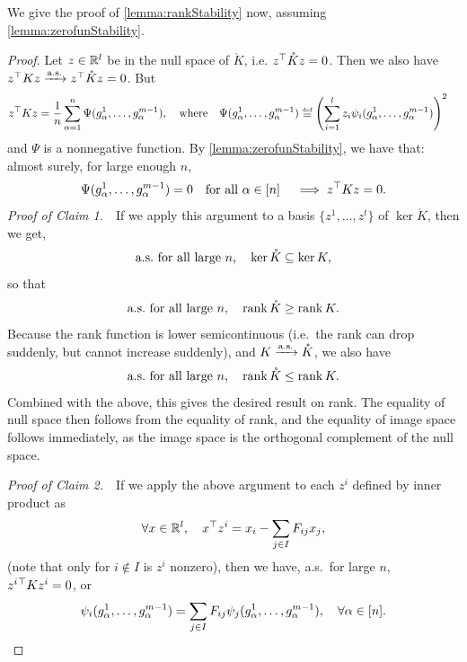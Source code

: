 \documentclass[main.tex]{subfiles}
\begin{document}
We give the proof of \cref{lemma:rankStability} now, assuming \cref{lemma:zerofunStability}.
\begin{proof}
  \newcommand{\myvv}{z}
Let $\myvv \in \R^l$ be in the null space of $\mathring K$, i.e. $\myvv^\trsp \mathring K \myvv = 0$.
Then we also have $\myvv^\trsp K \myvv \asto \myvv^\trsp \mathring K \myvv = 0$.
But
\begin{align*}
\myvv^\trsp K \myvv
    &=
        \f 1 n \sum_{\alpha=1}^n \Psi(g^1_\alpha, \ldots, g^{\MM-1}_\alpha)
        ,
        \quad
        \text{where}
        \quad
        \Psi(g^1_\alpha, \ldots, g^{\MM-1}_\alpha) \defeq
        \lp
            \sum_{i=1}^l \myvv_i \psi_i(g^1_\alpha, \ldots, g^{\MM-1}_\alpha)
        \rp^2
\end{align*}
and $\Psi$ is a nonnegative function.
By \cref{lemma:zerofunStability}, we have that: almost surely, for large enough $n$, 
\[\Psi(g^1_\alpha, \ldots, g^{\MM-1}_\alpha) = 0 \quad \text{for all $\alpha \in [n]$}
\quad
\implies \myvv^\trsp K \myvv = 0.\]
\textit{Proof of Claim 1.}\ \ 
If we apply this argument to a basis $\{\myvv^1, \ldots, \myvv^t\}$ of $\ker \mathring K$, then we get, 
\[\text{a.s.\ for all large $n$,}\quad 
\ker \mathring K \subseteq \ker K,\]
so that
\[\text{a.s.\ for all large $n$,}\quad 
\operatorname{rank} \mathring K \ge \operatorname{rank} K.\]
Because the rank function is lower semicontinuous (i.e.\ the rank can drop suddenly, but cannot increase suddenly), and $K \xrightarrow{\mathrm{a.s.}} \mathring K$, we also have
\[\text{a.s.\ for all large $n$,}\quad 
\operatorname{rank} \mathring K \le \operatorname{rank} K.\]
Combined with the above, this gives the desired result on rank.
The equality of null space then follows from the equality of rank, and the equality of image space follows immediately, as the image space is the orthogonal complement of the null space.

\textit{Proof of Claim 2.}\ \ 
If we apply the above argument to each $\myvv^i$ defined by inner product as
\[\forall x \in \R^l,\quad x^\trsp \myvv^i = x_i - \sum_{j \in I} F_{ij} x_j,
\]
(note that only for $i \not \in I$ is $\myvv^i$ nonzero),
then we have, a.s.\ for large $n$, $\myvv^i{}^\trsp K \myvv^i = 0$, or
\begin{equation*}
    \psi_i(g^1_\alpha, \ldots, g^{m-1}_\alpha)
    = \sum_{j \in I} F_{ij} \psi_j(g^1_\alpha, \ldots, g^{m-1}_\alpha),
    \quad \forall \alpha \in [n].
\end{equation*}
\end{proof}
\end{document}
